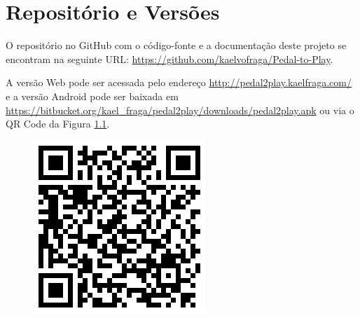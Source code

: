 \chapter{Repositório e Versões}
O repositório no GitHub com o código-fonte e a documentação deste projeto se encontram na seguinte URL: \url{https://github.com/kaelvofraga/Pedal-to-Play}.
\par
A versão Web pode ser acessada pelo endereço \url{http://pedal2play.kaelfraga.com/} e a versão Android pode ser baixada em \url{https://bitbucket.org/kael_fraga/pedal2play/downloads/pedal2play.apk} ou via o QR Code da Figura \ref{fig:qrcode}.

\begin{figure}[hb]
\begin{minipage}{1.0\textwidth}
  \centerline{\includegraphics[width=.3\linewidth]{figuras/qrcode.png}}
  \label{fig:qrcode}
\end{minipage}
\end{figure}